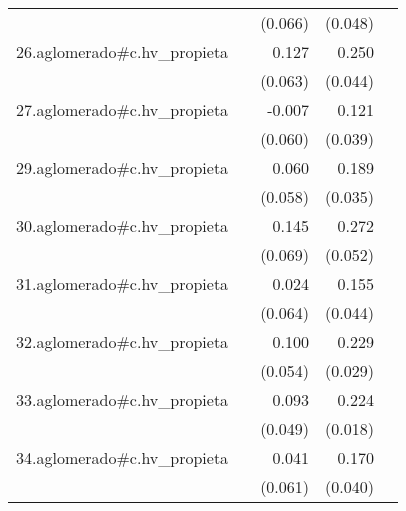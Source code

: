 {\begin{longtable}{l*{4}{D{.}{.}{-1}}}
            &                     &     (0.066)         &     (0.048)         &                     \\
\addlinespace
26.aglomerado#c.hv\_propieta&                     &       0.127\sym{*}  &       0.250\sym{***}&                     \\
            &                     &     (0.063)         &     (0.044)         &                     \\
\addlinespace
27.aglomerado#c.hv\_propieta&                     &      -0.007         &       0.121\sym{**} &                     \\
            &                     &     (0.060)         &     (0.039)         &                     \\
\addlinespace
29.aglomerado#c.hv\_propieta&                     &       0.060         &       0.189\sym{***}&                     \\
            &                     &     (0.058)         &     (0.035)         &                     \\
\addlinespace
30.aglomerado#c.hv\_propieta&                     &       0.145\sym{*}  &       0.272\sym{***}&                     \\
            &                     &     (0.069)         &     (0.052)         &                     \\
\addlinespace
31.aglomerado#c.hv\_propieta&                     &       0.024         &       0.155\sym{***}&                     \\
            &                     &     (0.064)         &     (0.044)         &                     \\
\addlinespace
32.aglomerado#c.hv\_propieta&                     &       0.100         &       0.229\sym{***}&                     \\
            &                     &     (0.054)         &     (0.029)         &                     \\
\addlinespace
33.aglomerado#c.hv\_propieta&                     &       0.093         &       0.224\sym{***}&                     \\
            &                     &     (0.049)         &     (0.018)         &                     \\
\addlinespace
34.aglomerado#c.hv\_propieta&                     &       0.041         &       0.170\sym{***}&                     \\
            &                     &     (0.061)         &     (0.040)         &                     \\

\end{longtable}}
